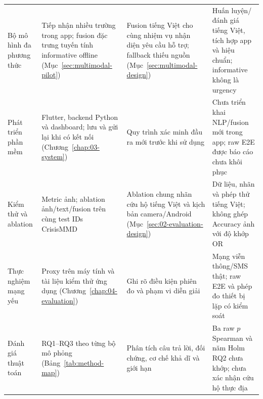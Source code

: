 \begin{longtable}{P{.18\textwidth}P{.25\textwidth}P{.24\textwidth}P{.21\textwidth}}
Bộ mô hình đa phương thức & Tiếp nhận nhiều trường trong app; fusion đặc trưng tuyến tính informative offline (Mục~\ref{sec:multimodal-pilot}) & Fusion tiếng Việt cho cùng nhiệm vụ nhận diện yêu cầu hỗ trợ; fallback thiếu nguồn (Mục~\ref{sec:multimodal-design}) & Huấn luyện/đánh giá tiếng Việt, tích hợp app và hiệu chuẩn; informative không là urgency \\
Phát triển phần mềm & Flutter, backend Python và dashboard; lưu và gửi lại khi có kết nối (Chương~\ref{chap:03-system}) & Quy trình xác minh đầu ra mới trước khi sử dụng & Chưa triển khai NLP/fusion mới trong app; raw E2E được báo cáo chưa khôi phục \\
Kiểm thử và ablation & Metric ảnh; ablation ảnh/text/fusion trên cùng \MMTestN{} test IDs CrisisMMD & Ablation chung nhãn cứu hộ tiếng Việt và kịch bản camera/Android (Mục~\ref{sec:02-evaluation-design}) & Dữ liệu, nhãn và phép thử tiếng Việt; không ghép Accuracy ảnh với độ khớp OR \\
Thực nghiệm mạng yếu & Proxy trên máy tính và tài liệu kiểm thử ứng dụng (Chương~\ref{chap:04-evaluation}) & Ghi rõ điều kiện phiên đo và phạm vi diễn giải & Mạng viễn thông/SMS thật; raw E2E và phép đo thiết bị lặp có kiểm soát \\
Đánh giá thuật toán & RQ1--RQ3 theo từng bộ mô phỏng (Bảng~\ref{tab:method-map}) & Phân tích câu trả lời, đối chứng, cơ chế khả dĩ và giới hạn & Ba raw $p$ Spearman và năm Holm RQ2 chưa khớp; chưa xác nhận cứu hộ thực địa \\
\bottomrule
\end{longtable}
